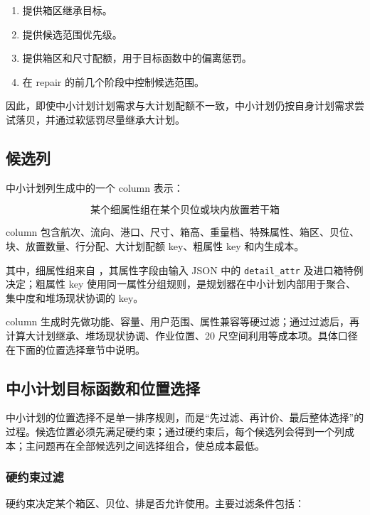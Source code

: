 \documentclass[UTF8,fontset=windows,zihao=-4]{ctexart}
\newcommand{\code}[1]{\texttt{\detokenize{#1}}}
\newcommand{\param}[1]{\nolinkurl{#1}}
\begin{document}
\begin{enumerate}
  \item 提供箱区继承目标。
  \item 提供候选范围优先级。
  \item 提供箱区和尺寸配额，用于目标函数中的偏离惩罚。
  \item 在 repair 的前几个阶段中控制候选范围。
\end{enumerate}

因此，即使中小计划计划需求与大计划配额不一致，中小计划仍按自身计划需求尝试落贝，并通过软惩罚尽量继承大计划。

\subsection{候选列}

中小计划列生成中的一个 column 表示：

\[
\text{某个细属性组在某个贝位或块内放置若干箱}
\]

column 包含航次、流向、港口、尺寸、箱高、重量档、特殊属性、箱区、贝位、块、放置数量、行分配、大计划配额 key、粗属性 key 和内生成本。

其中，细属性组来自 \code{small_groups}，其属性字段由输入 JSON 中的 \param{detail_attr} 及进口箱特例决定；粗属性 key 使用同一属性分组规则，是规划器在中小计划内部用于聚合、集中度和堆场现状协调的 key。

column 生成时先做功能、容量、用户范围、属性兼容等硬过滤；通过过滤后，再计算大计划继承、堆场现状协调、作业位置、20 尺空间利用等成本项。具体口径在下面的位置选择章节中说明。

\subsection{中小计划目标函数和位置选择}

中小计划的位置选择不是单一排序规则，而是“先过滤、再计价、最后整体选择”的过程。候选位置必须先满足硬约束；通过硬约束后，每个候选列会得到一个列成本；主问题再在全部候选列之间选择组合，使总成本最低。

\subsubsection{硬约束过滤}

硬约束决定某个箱区、贝位、排是否允许使用。主要过滤条件包括：
\end{document}
